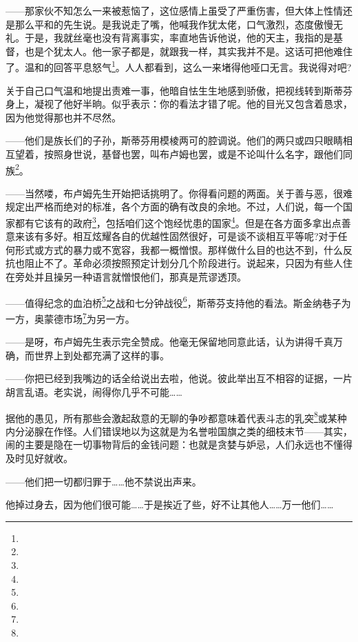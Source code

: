 \par ——那家伙不知怎么一来被惹恼了，这位感情上虽受了严重伤害，但大体上性情还是那么平和的先生说。是我说走了嘴，他喊我作犹太佬，口气激烈，态度傲慢无礼。于是，我就丝毫也没有背离事实，率直地告诉他说，他的天主，我指的是基督，也是个犹太人。他一家子都是，就跟我一样，其实我并不是。这话可把他难住了。温和的回答平息怒气\footnote{}。人人都看到，这么一来堵得他哑口无言。我说得对吧?
\par 关于自己口气温和地提出责难一事，他暗自怯生生地感到骄傲，把视线转到斯蒂芬身上，凝视了他好半晌。似乎表示：你的看法才错了呢。他的目光又包含着恳求，因为他觉得那也并不尽然。
\par ——他们是族长们的子孙，斯蒂芬用模棱两可的腔调说。他们的两只或四只眼睛相互望着，按照身世说，基督也罢，叫布卢姆也罢，或是不论叫什么名字，跟他们同族\footnote{}。
\par ——当然喽，布卢姆先生开始把话挑明了。你得看问题的两面。关于善与恶，很难规定出严格而绝对的标准，各个方面的确有改良的余地。不过，人们说，每一个国家都有它该有的政府\footnote{}，包括咱们这个饱经忧患的国家\footnote{}。但是在各方面多拿出点善意来该有多好。相互炫耀各自的优越性固然很好，可是谈不谈相互平等呢?对于任何形式或方式的暴力或不宽容，我都一概憎恨。那样做什么目的也达不到，什么反抗也阻止不了。革命必须按照预定计划分几个阶段进行。说起来，只因为有些人住在旁处并且操另一种语言就憎恨他们，那真是荒谬透顶。
\par ——值得纪念的血泊桥\footnote{}之战和七分钟战役\footnote{}，斯蒂芬支持他的看法。斯金纳巷子为一方，奥蒙德市场\footnote{}为另一方。
\par ——是呀，布卢姆先生表示完全赞成。他毫无保留地同意此话，认为讲得千真万确，而世界上到处都充满了这样的事。
\par ——你把已经到我嘴边的话全给说出去啦，他说。彼此举出互不相容的证据，一片胡言乱语。老实说，闹得你几乎不可能……
\par 据他的愚见，所有那些会激起敌意的无聊的争吵都意味着代表斗志的乳突\footnote{}或某种内分泌腺在作怪。人们错误地以为这就是为名誉啦国旗之类的细枝末节——其实，闹的主要是隐在一切事物背后的金钱问题：也就是贪婪与妒忌，人们永远也不懂得及时见好就收。
\par ——他们把一切都归罪于……他不禁说出声来。
\par 他掉过身去，因为他们很可能……于是挨近了些，好不让其他人……万一他们……
